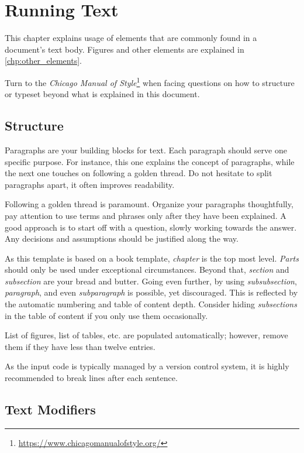 \chapter{Running Text}
\label{chp:running_text}

This chapter explains usage of elements that are commonly found in a document's text body.
Figures and other elements are explained in \cref{chp:other_elements}.

Turn to the \emph{Chicago Manual of Style}\footnote{\url{https://www.chicagomanualofstyle.org/}} when facing questions on how to structure or typeset beyond what is explained in this document.

\section{Structure}

Paragraphs are your building blocks for text.
Each paragraph should serve one specific purpose.
For instance, this one explains the concept of paragraphs, while the next one touches on following a golden thread.
Do not hesitate to split paragraphs apart, it often improves readability.

Following a golden thread is paramount.
Organize your paragraphs thoughtfully, pay attention to use terms and phrases only after they have been explained.
A good approach is to start off with a question, slowly working towards the answer.
Any decisions and assumptions should be justified along the way.

As this template is based on a book template, \emph{chapter} is the top most level.
\emph{Parts} should only be used under exceptional circumstances.
Beyond that, \emph{section} and \emph{subsection} are your bread and butter.
Going even further, by using \emph{subsubsection}, \emph{paragraph}, and even \emph{subparagraph} is possible, yet discouraged.
This is reflected by the automatic numbering and table of content depth.
Consider hiding \emph{subsections} in the table of content if you only use them occasionally.

List of figures, list of tables, etc. are populated automatically; however, remove them if they have less than twelve entries.

As the input code is typically managed by a version control system, it is highly recommended to break lines after each sentence.

\section{Text Modifiers}

